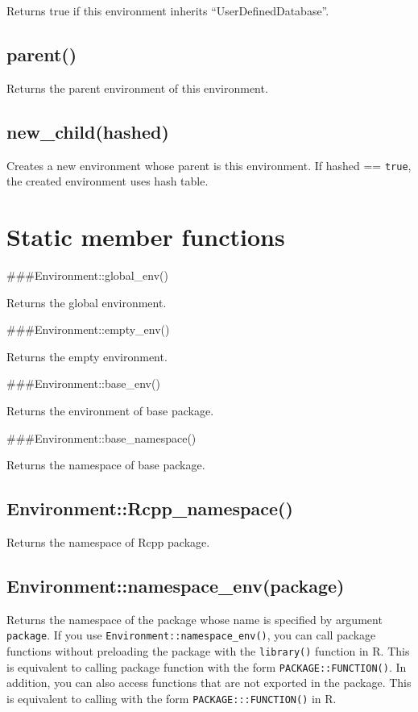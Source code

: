 \documentclass[
]{book}
\begin{document}
Returns true if this environment inherits ``UserDefinedDatabase''.

\hypertarget{parent}{%
\subsection{parent()}\label{parent}}

Returns the parent environment of this environment.

\hypertarget{new_childhashed}{%
\subsection{new\_child(hashed)}\label{new_childhashed}}

Creates a new environment whose parent is this environment. If hashed == \texttt{true}, the created environment uses hash table.

\hypertarget{static-member-functions}{%
\section{Static member functions}\label{static-member-functions}}

\#\#\#Environment::global\_env()

Returns the global environment.

\#\#\#Environment::empty\_env()

Returns the empty environment.

\#\#\#Environment::base\_env()

Returns the environment of base package.

\#\#\#Environment::base\_namespace()

Returns the namespace of base package.

\hypertarget{environmentrcpp_namespace}{%
\subsection{Environment::Rcpp\_namespace()}\label{environmentrcpp_namespace}}

Returns the namespace of Rcpp package.

\hypertarget{environmentnamespace_envpackage}{%
\subsection{Environment::namespace\_env(package)}\label{environmentnamespace_envpackage}}

Returns the namespace of the package whose name is specified by argument \texttt{package}. If you use \texttt{Environment::namespace\_env()}, you can call package functions without preloading the package with the \texttt{library()} function in R. This is equivalent to calling package function with the form \texttt{PACKAGE::FUNCTION()}. In addition, you can also access functions that are not exported in the package. This is equivalent to calling with the form \texttt{PACKAGE:::FUNCTION()} in R.
\end{document}
